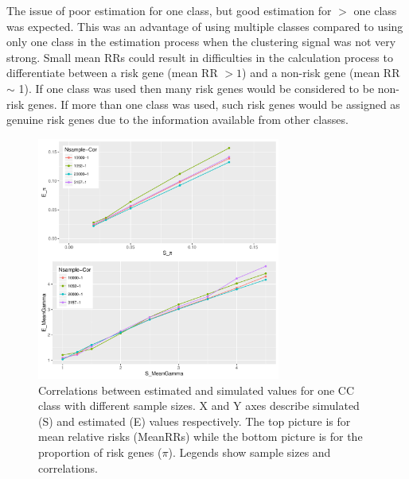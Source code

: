\documentclass[]{article}
\begin{document}
The issue of poor estimation for one class, but good estimation
for $>$ one class was expected. This was an advantage of using
multiple classes compared to using only one class in the estimation
process when the clustering signal was not very strong.  Small mean RRs could result in difficulties in the calculation
process to differentiate between a risk gene (mean RR $> 1$) and a
non-risk gene (mean RR $\sim$ 1). If one class was used
then many risk genes would be considered to be non-risk genes. If more
than one class was used, such risk genes would be assigned as genuine
risk genes due to the information available from other classes.



\begin{figure}[ht]
\centering
\includegraphics[width=\textwidth,height=8cm]{Picture/PUBOnlyCCnSample.pdf}
\caption{Correlations between estimated and simulated values for one
  CC class with different sample sizes.  X and Y axes describe simulated (S) and estimated (E)
  values respectively. The top picture is for mean relative risks
  (MeanRRs) while the bottom picture is for the proportion of risk
  genes ($\pi$). Legends show sample sizes and correlations.}
\label{tab:CorrelationOneClassCC}
\end{figure}
\end{document}
